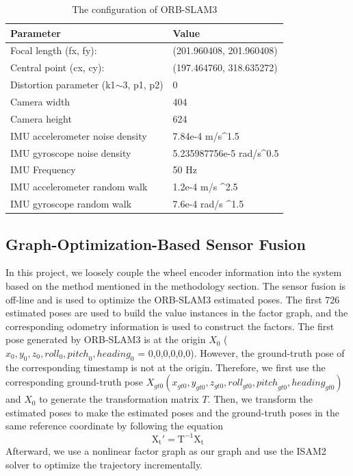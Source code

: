 \documentclass[letterpaper, 10 pt, conference]{ieeeconf}  %
\begin{document}
\begin{table}[ht]
\caption{The configuration of ORB-SLAM3}
\label{tab_orbslam_config}
\begin{tabular}{||l|l||}
\hline
Parameter                                & Value                                     \\ \hline
Focal   length (fx, fy):                 & (201.960408, 201.960408)                  \\ \hline
Central point (cx, cy):                  & (197.464760, 318.635272)                  \\ \hline
Distortion parameter (k1$\sim$3, p1, p2) & 0                                         \\ \hline
Camera width                             & 404                                       \\ \hline
Camera height                            & 624                                       \\ \hline
IMU accelerometer noise   density        & 7.84e-4 m/s\textasciicircum{}1.5          \\ \hline
IMU gyroscope noise density              & 5.235987756e-5 rad/s\textasciicircum{}0.5 \\ \hline
IMU Frequency                            & 50 Hz                                     \\ \hline
IMU accelerometer random walk            & 1.2e-4 m/s   \textasciicircum{}2.5        \\ \hline
IMU gyroscope random walk                & 7.6e-4 rad/s   \textasciicircum{}1.5      \\ \hline
\end{tabular}
\end{table}


\subsection{Graph-Optimization-Based Sensor Fusion} 

In this project, we loosely couple the wheel encoder information into the system based on the method mentioned in the methodology section. The sensor fusion is off-line and is used to optimize the ORB-SLAM3 estimated poses. The first 726 estimated poses are used to build the value instances in the factor graph, and the corresponding odometry information is used to construct the factors. The first pose generated by ORB-SLAM3 is at the origin $X_0$ ($x_0,y_0,z_0,{roll}_0,{pitch}_0,{heading}_0$ = 0,0,0,0,0,0). However, the ground-truth pose of the corresponding timestamp is not at the origin. Therefore, we first use the corresponding ground-truth pose $ X_{gt0} (x_{gt0},y_{gt0},z_{gt0},{roll}_{gt0},{pitch}_{gt0},{heading}_{gt0})$ and $X_0$ to generate the transformation matrix $T$. Then, we transform the estimated poses to make the estimated poses and the ground-truth poses in the same reference coordinate by following the equation 
\begin{equation}
\mathrm{X_t'}=\mathrm{T}^{-1} \mathrm{X_t}
\end{equation}
Afterward, we use a nonlinear factor graph as our graph and use the ISAM2 solver to optimize the trajectory incrementally.
\end{document}
